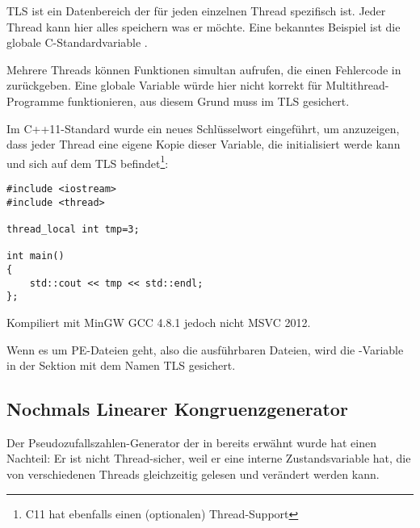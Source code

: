 \label{TLS}

TLS ist ein Datenbereich der für jeden einzelnen Thread spezifisch ist.
Jeder Thread kann hier alles speichern was er möchte.
Eine bekanntes Beispiel ist die globale C-Standardvariable .

Mehrere Threads können Funktionen simultan aufrufen, die einen Fehlercode in  zurückgeben.
Eine globale Variable würde hier nicht korrekt für Multithread-Programme funktionieren,
aus diesem Grund muss  im \ac{TLS} gesichert.

Im C++11-Standard wurde ein neues Schlüsselwort  eingeführt,
um anzuzeigen, dass jeder Thread eine eigene Kopie dieser Variable, die initialisiert werde kann
und sich auf dem \ac{TLS} befindet\footnote{ C11 hat ebenfalls einen (optionalen) Thread-Support}:

\begin{lstlisting}[caption=C++11]
#include <iostream>
#include <thread>

thread_local int tmp=3;

int main()
{
	std::cout << tmp << std::endl;
};
\end{lstlisting}

Kompiliert mit MinGW GCC 4.8.1 jedoch nicht MSVC 2012.

Wenn es um PE-Dateien geht, also die ausführbaren Dateien, wird die -Variable
in der Sektion mit dem Namen \ac{TLS} gesichert.

\subsection{Nochmals Linearer Kongruenzgenerator}
\label{LCG_TLS}

Der Pseudozufallszahlen-Generator der in  bereits erwähnt wurde hat einen Nachteil:
Er ist nicht Thread-sicher, weil er eine interne Zustandsvariable hat, die von verschiedenen Threads
gleichzeitig gelesen und verändert werden kann.



